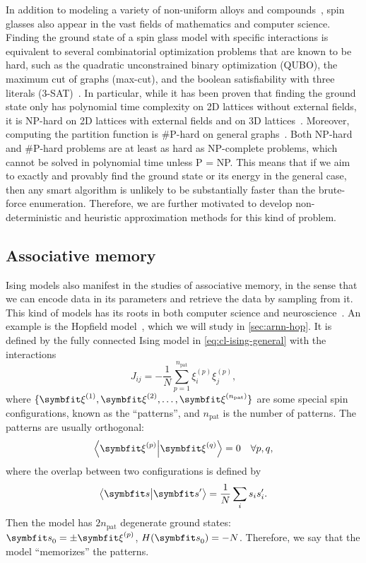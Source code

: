 In addition to modeling a variety of non-uniform alloys and compounds~\cite{mydosh2015spin}, spin glasses also appear in the vast fields of mathematics and computer science. Finding the ground state of a spin glass model with specific interactions is equivalent to several combinatorial optimization problems that are known to be hard, such as the quadratic unconstrained binary optimization (QUBO), the maximum cut of graphs (max-cut), and the boolean satisfiability with three literals (3-SAT)~\cite{karp1972reducibility}. In particular, while it has been proven that finding the ground state only has polynomial time complexity on 2D lattices without external fields, it is NP-hard on 2D lattices with external fields and on 3D lattices~\cite{barahona1982computational}. Moreover, computing the partition function is \#P-hard on general graphs~\cite{galanis2016inapproximability, fefferman2017exact, peters2020location}. Both NP-hard and \#P-hard problems are at least as hard as NP-complete problems, which cannot be solved in polynomial time unless P = NP. This means that if we aim to exactly and provably find the ground state or its energy in the general case, then any smart algorithm is unlikely to be substantially faster than the brute-force enumeration. Therefore, we are further motivated to develop non-deterministic and heuristic approximation methods for this kind of problem.

\subsection{Associative memory}
\label{sec:hopfield}

Ising models also manifest in the studies of associative memory, in the sense that we can encode data in its parameters and retrieve the data by sampling from it. This kind of models has its roots in both computer science and neuroscience~\cite{carpenter1989neural}. An example is the Hopfield model~\cite{hopfield1982neural, amit1985spin}, which we will study in \cref{sec:arnn-hop}. It is defined by the fully connected Ising model in \cref{eq:cl-ising-general} with the interactions
\begin{equation}
J_{i j} = -\frac{1}{N} \sum_{p = 1}^{n_\text{pat}} \xi^{(p)}_i \xi^{(p)}_j,
\label{eq:hopfield}
\end{equation}
where $\{\vxi^{(1)}, \vxi^{(2)}, \ldots, \vxi^{(n_\text{pat})}\}$ are some special spin configurations, known as the ``patterns'', and $n_\text{pat}$ is the number of patterns. The patterns are usually orthogonal:
\begin{equation}
\ip{\vxi^{(p)}}{\vxi^{(q)}} = 0 \quad \forall p, q,
\label{eq:cl-ortho}
\end{equation}
where the overlap between two configurations is defined by
\begin{equation}
\ip{\vs}{\vs'} = \frac{1}{N} \sum_i s_i s'_i.
\label{eq:cl-overlap}
\end{equation}
Then the model has $2 n_\text{pat}$ degenerate ground states: $\vs_0 = \pm \vxi^{(p)}$, $H(\vs_0) = -N$. Therefore, we say that the model ``memorizes'' the patterns.

